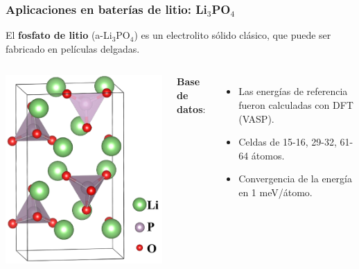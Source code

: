 \documentclass[aspectratio=169]{beamer}
\let\oldtextbf\textbf
\renewcommand{\textbf}[1]{\textcolor{nordblue}{\oldtextbf{#1}}}
\begin{document}
    \begin{frame}
        \frametitle{Aplicaciones en baterías de litio: Li$_3$PO$_4$}
            
        El \textbf{fosfato de litio} (a-Li$_3$PO$_4$) es un electrolito sólido 
        clásico, que puede ser fabricado en películas delgadas.
            
        \begin{columns}
            \begin{center}
                \includegraphics[width=\columnwidth]{Li3PO4-estructura.png}
            \end{center}
        
            \pause 

            \textbf{Base de datos}:
            \begin{itemize}
                \item Las energías de referencia fueron calculadas con DFT (VASP).
                \item Celdas de 15-16, 29-32, 61-64 átomos.
                \item Convergencia de la energía en 1 meV/átomo.


\end{itemize}
\end{columns}
\end{frame}
\end{document}
